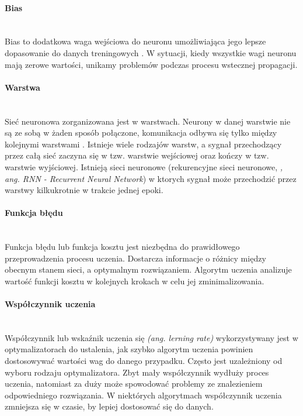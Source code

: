 \paragraph{Bias} \mbox{}\\
Bias to dodatkowa waga wejściowa do neuronu umożliwiająca jego lepsze dopasowanie
do danych treningowych \cite{needForBias}. W sytuacji, kiedy wszystkie wagi neuronu mają zerowe
wartości, unikamy problemów podczas procesu wstecznej propagacji.

\paragraph{Warstwa} \mbox{}\\
Sieć neuronowa zorganizowana jest w warstwach. Neurony w danej warstwie nie są
ze sobą w żaden sposób połączone, komunikacja odbywa się tylko między kolejnymi
warstwami \cite{CS231n, substBigConv}. Istnieje wiele rodzajów warstw, a sygnał przechodzący przez całą
sieć zaczyna się w tzw. warstwie wejściowej oraz kończy w tzw. warstwie wyjściowej.
Istnieją sieci neuronowe (rekurencyjne sieci neuronowe, \textit{, ang. RNN - Recurrent Neural Network})
w ktorych sygnał może przechodzić przez warstwy kilkukrotnie w trakcie jednej epoki.

\paragraph{Funkcja błędu} \mbox{}\\
Funkcja błędu lub funkcja kosztu jest niezbędna do prawidłowego przeprowadzenia
procesu uczenia. Dostarcza informacje o różnicy między obecnym stanem sieci, a
optymalnym rozwiązaniem. Algorytm uczenia analizuje wartość funkcji kosztu
w kolejnych krokach w celu jej zminimalizowania.

\paragraph{Współczynnik uczenia} \mbox{}\\
Współczynnik lub wskaźnik uczenia się \textit{(ang. lerning rate)} wykorzystywany jest
w optymalizatorach do ustalenia, jak szybko algorytm uczenia powinien dostosowywać wartości
wag do danego przypadku. Często jest uzależniony od wyboru rodzaju optymalizatora. Zbyt mały
współczynnik wydłuży proces uczenia, natomiast za duży może spowodować problemy ze znalezieniem
odpowiedniego rozwiązania. W niektórych algorytmach współczynnik uczenia zmniejsza się w czasie,
by lepiej dostosować się do danych.

